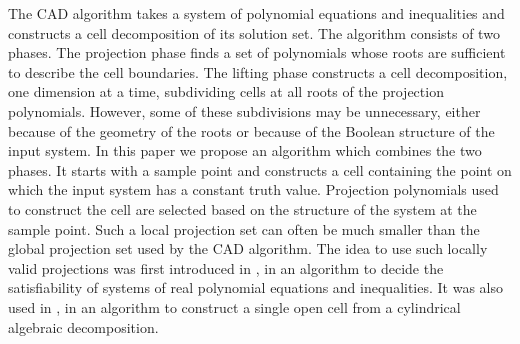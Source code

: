 \documentclass[english]{amsart}
\numberwithin{equation}{section}
\numberwithin{figure}{section}
\begin{document}
The CAD algorithm takes a system of polynomial equations and inequalities
and constructs a cell decomposition of its solution set. The algorithm
consists of two phases. The projection phase finds a set of polynomials
whose roots are sufficient to describe the cell boundaries. The lifting
phase constructs a cell decomposition, one dimension at a time, subdividing
cells at all roots of the projection polynomials. However, some of
these subdivisions may be unnecessary, either because of the geometry
of the roots or because of the Boolean structure of the input system.
In this paper we propose an algorithm which combines the two phases.
It starts with a sample point and constructs a cell containing the
point on which the input system has a constant truth value. Projection
polynomials used to construct the cell are selected based on the structure
of the system at the sample point. Such a local projection set can
often be much smaller than the global projection set used by the CAD
algorithm. The idea to use such locally valid projections was first
introduced in \cite{JM}, in an algorithm to decide the satisfiability
of systems of real polynomial equations and inequalities. It was also
used in \cite{B4}, in an algorithm to construct a single open cell
from a cylindrical algebraic decomposition. 
\end{document}
